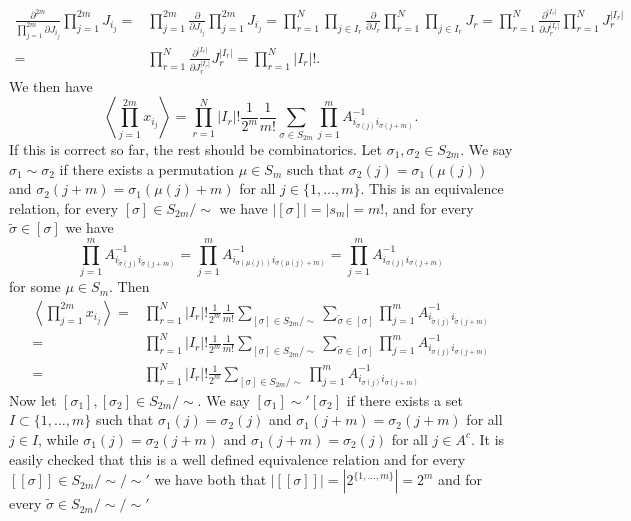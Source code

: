 \documentclass{article}
\begin{document}
$$\begin{aligned}\frac{\partial^{2m}}{\prod_{j=1}^{2m}\partial J_{i_j}}\prod_{j=1}^{2m} J_{i_j}=&\prod_{j=1}^{2m}\frac{\partial}{\partial J_{i_j}}\prod_{j=1}^{2m} J_{i_j}=\prod_{r=1}^N\prod_{j\in I_r}\frac{\partial}{\partial J_r}\prod_{r=1}^N\prod_{j\in I_r}J_r=\prod_{r=1}^N\frac{\partial^{|I_r|}}{\partial J_r^{|I_r|}}\prod_{r=1}^NJ_r^{|I_r|}\\
=&\prod_{r=1}^N\frac{\partial^{|I_r|}}{\partial J_r^{|I_r|}}J_r^{|I_r|}=\prod_{r=1}^N|I_r|!.\end{aligned}$$
We then have
$$\left\langle \prod_{j=1}^{2m}x_{i_j}\right\rangle=\prod_{r=1}^N|I_r|!\frac{1}{2^m}\frac{1}{m!}\sum_{\sigma\in S_{2m}}\prod_{j=1}^m A^{-1}_{i_{\sigma(j)}i_{\sigma(j+m)}}.$$
If this is correct so far, the rest should be combinatorics. Let $\sigma_1,\sigma_2\in S_{2m}$. We say $\sigma_1\sim\sigma_2$ if there exists a permutation $\mu\in S_m$ such that $\sigma_2(j)=\sigma_1(\mu(j))$ and $\sigma_2(j+m)=\sigma_1(\mu(j)+m)$ for all $j\in\{1,\dots,m\}$. This is an equivalence relation, for every $[\sigma]\in S_{2m}/\sim$ we have $|[\sigma]|=|s_m|=m!$, and for every $\tilde{\sigma}\in[\sigma]$ we have
$$\prod_{j=1}^m A^{-1}_{i_{\tilde{\sigma}(j)}i_{\tilde{\sigma}(j+m)}}=\prod_{j=1}^m A^{-1}_{i_{\sigma(\mu(j))}i_{\sigma(\mu(j)+m)}}=\prod_{j=1}^m A^{-1}_{i_{\sigma(j)}i_{\sigma(j+m)}}$$
for some $\mu\in S_m$. Then
$$\begin{aligned}
\left\langle \prod_{j=1}^{2m}x_{i_j}\right\rangle=&\prod_{r=1}^N|I_r|!\frac{1}{2^m}\frac{1}{m!}\sum_{[\sigma]\in S_{2m}/\sim}\sum_{\tilde{\sigma}\in[\sigma]}\prod_{j=1}^m A^{-1}_{i_{\tilde{\sigma}(j)}i_{\tilde{\sigma}(j+m)}}\\
=&\prod_{r=1}^N|I_r|!\frac{1}{2^m}\frac{1}{m!}\sum_{[\sigma]\in S_{2m}/\sim}\sum_{\tilde{\sigma}\in[\sigma]}\prod_{j=1}^m A^{-1}_{i_{\sigma(j)}i_{\sigma(j+m)}}\\
=&\prod_{r=1}^N|I_r|!\frac{1}{2^m}\sum_{[\sigma]\in S_{2m}/\sim}\prod_{j=1}^m A^{-1}_{i_{\sigma(j)}i_{\sigma(j+m)}}\end{aligned}$$
Now let $[\sigma_1],[\sigma_2]\in S_{2m}/\sim$. We say $[\sigma_1]\sim'[\sigma_2]$ if there exists a set $I\subset\{1,\dots,m\}$ such that $\sigma_1(j)=\sigma_2(j)$ and $\sigma_1(j+m)=\sigma_2(j+m)$ for all $j\in I$, while $\sigma_1(j)=\sigma_2(j+m)$ and $\sigma_1(j+m)=\sigma_2(j)$ for all $j\in A^c$. It is easily checked that this is a well defined equivalence relation and for every $[[\sigma]]\in S_{2m}/\sim/\sim'$ we have both that $|[[\sigma]]|=|2^{\{1,\dots,m\}}|=2^m$ and for every $\tilde{\sigma}\in S_{2m}/\sim/\sim'$
\end{document}
